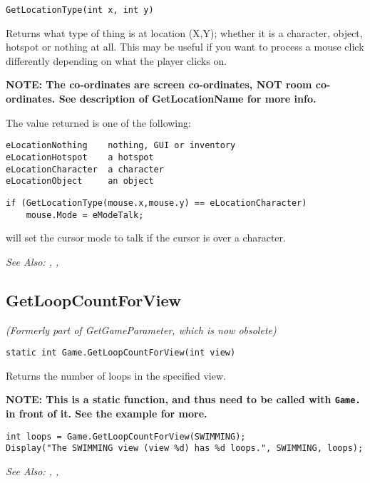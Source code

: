 \begin{verbatim}
GetLocationType(int x, int y)
\end{verbatim}
Returns what type of thing is at location (X,Y); whether it is a character,
object, hotspot or nothing at all. This may be useful if you want to
process a mouse click differently depending on what the player clicks on.

\bf{NOTE:} The co-ordinates are screen co-ordinates, NOT room co-ordinates. See
description of GetLocationName for more info.

The value returned is one of the following:
\begin{verbatim}
eLocationNothing    nothing, GUI or inventory
eLocationHotspot    a hotspot
eLocationCharacter  a character
eLocationObject     an object
\end{verbatim}

\begin{verbatim}
if (GetLocationType(mouse.x,mouse.y) == eLocationCharacter)
    mouse.Mode = eModeTalk;
\end{verbatim}
will set the cursor mode to talk if the cursor is over a character.

\it{See Also:} ,
,


\subsection{GetLoopCountForView}\label{Game.GetLoopCountForView}%

\it{(Formerly part of GetGameParameter, which is now obsolete)}

\begin{verbatim}
static int Game.GetLoopCountForView(int view)
\end{verbatim}
Returns the number of loops in the specified view.

\bf{NOTE:} This is a static function, and thus need to be called with \verb$Game.$ in front of it. See
the example for more.

\begin{verbatim}
int loops = Game.GetLoopCountForView(SWIMMING);
Display("The SWIMMING view (view %d) has %d loops.", SWIMMING, loops);
\end{verbatim}

\it{See Also:} ,
,


